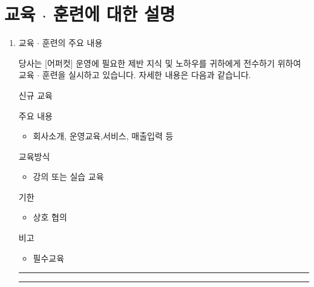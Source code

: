 \documentclass[a5paper,10pt]{oblivoir}
\newcommand\crule[3][black]{\textcolor{#1}{\rule{#2}{#3}}}
\begin{document}
\section{ 교육 $\cdot$ 훈련에 대한 설명}
\begin{enumerate}

\item 교육 $\cdot$ 훈련의 주요 내용

당사는 [어퍼컷] 운영에 필요한 제반 지식 및 노하우를 귀하에게 전수하기 위하여 교육 $\cdot$ 훈련을 실시하고 있습니다. 자세한 내용은 다음과 같습니다.

\begin{tiny}
\begin{Form}
\def\LayoutCheckField#1#2{%
  \parbox[c][5mm]{5mm}{\centering\footnotesize\strut #1\\#2}%
}
\def\LayoutCheckField#1#2{%
  \makebox[0pt][l]{%
    \makebox[5mm][c]{\footnotesize\strut #1}%
  }%
  #2%
}
\def\DefaultHeightofCheckBox{5mm}
\def\DefaultWidthofCheckBox{5mm}

\rule{0cm}{.5cm}

 신규 교육

\noindent\dotfill 
 주요 내용

\begin{itemize}
\item 회사소개, 운영교육,서비스, 매출입력 등
\end{itemize}

\noindent\dotfill 
 교육방식

\begin{itemize}
\item  강의  또는 실습 교육
\end{itemize}

\noindent\dotfill 
 기한

\begin{itemize}
\item 상호 협의
\end{itemize}

\noindent\dotfill 
 비고

\begin{itemize}
\item 필수교육
\end{itemize}

\end{Form}
\end{tiny}

\newpage
\begin{center}
\crule[red]{4cm}{0.1cm} \crule[blue]{4cm}{0.1cm}
\end{center}


\end{enumerate}
\end{document}
